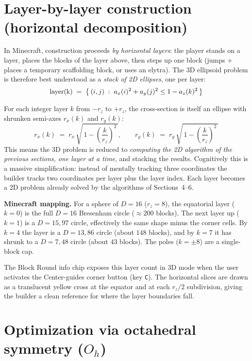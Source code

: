 \documentclass[12pt,a4paper]{scrartcl}
\newcommand{\code}[1]{\texttt{\small #1}}
\begin{document}
\section{Layer-by-layer construction (horizontal decomposition)}

In Minecraft, construction proceeds \emph{by horizontal layers}: the player stands on a layer, places the blocks of the layer above, then steps up one block (jumps + places a temporary scaffolding block, or uses an elytra). The 3D ellipsoid problem is therefore best understood as a \emph{stack of 2D ellipses}, one per layer:
\[
\text{\text{layer}(k)} \;=\; \bigl\{\,(i,j)\;:\;a_x(i)^2 + a_y(j)^2 \leq 1 - a_z(k)^2\,\bigr\}
\]

For each integer layer $k$ from $-r_z$ to $+r_z$, the cross-section is itself an ellipse with shrunken semi-axes $r_x(k)$ and $r_y(k)$:
\[
r_x(k) \;=\; r_x\,\sqrt{\,1 - \left(\dfrac{k}{r_z}\right)^{\!2}\,},
\qquad
r_y(k) \;=\; r_y\,\sqrt{\,1 - \left(\dfrac{k}{r_z}\right)^{\!2}\,}
\]
This means the 3D problem is reduced to \emph{computing the 2D algorithm of the previous sections, one layer at a time}, and stacking the results. Cognitively this is a massive simplification: instead of mentally tracking three coordinates the builder tracks two coordinates per layer plus the layer index. Each layer becomes a 2D problem already solved by the algorithms of Sections~4--6.

\begin{minec}
\textbf{Minecraft mapping.} For a sphere of $D=16$ ($r_z = 8$), the equatorial layer ($k=0$) is the full $D=16$ Bresenham circle ($\approx 200$ blocks). The next layer up ($k=1$) is a $D=15{,}97$ circle, effectively the same shape minus the corner cells. By $k=4$ the layer is a $D=13{,}86$ circle (about $148$ blocks), and by $k=7$ it has shrunk to a $D=7{,}48$ circle (about $43$ blocks). The poles ($k = \pm 8$) are a single-block cap.
\end{minec}

The Block Round info chip exposes this layer count in 3D mode when the user activates the Center-guides corner button (key \code{C}). The horizontal slices are drawn as a translucent yellow cross at the equator and at each $r_z/2$ subdivision, giving the builder a clean reference for where the layer boundaries fall.

\section{Optimization via octahedral symmetry ($O_h$)}
\end{document}
